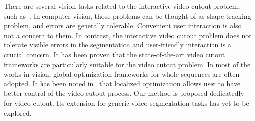 \documentclass[10pt,journal,compsoc]{newIEEEtran}
\begin{document}
There are several vision tasks related to the interactive video cutout problem, such as~\cite{Xiao2005motionseg,lee2011key,MinglunGong2011VideoSeg,Papazoglou2013fastVseg,chen2013deepshapeprior,Jain2014supervoxelVseg,khoreva2015classifierVseg}. In computer vision, those problems can be thought of as shape tracking problem, and errors are generally tolerable. Convenient user interaction is also not a concern to them. In contrast, the interactive video cutout problem does not tolerate visible errors in the segmentation and user-friendly interaction is a crucial concern. It has been proven that the state-of-the-art video cutout frameworks are particularly suitable for the video cutout problem. In most of the works in vision, global optimization frameworks for whole sequences are often adopted. It has been noted in~\cite{Bai09VideoSnapCut_SIGGRAPH} that localized optimization allows user to have better control of the video cutout process. Our method is proposed dedicatedly for video cutout. Its extension for generic video segmentation tasks has yet to be explored.
\end{document}
